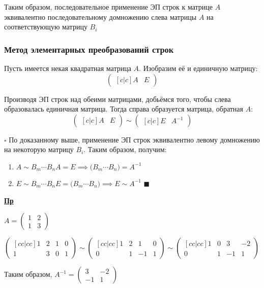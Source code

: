 \documentclass[12pt, a4paper]{report}
\newcommand{\ex}{\begin{flushleft}\textbf{\underline{Пр}}\end{flushleft}}
\begin{document}
	\bigskip Таким образом, последовательное применение ЭП строк к матрице \(A\) эквивалентно последовательному домножению слева матрицы \(A\) на соответствующую матрицу \(B_{i}\)
	
	\subsubsection{Метод элементарных преобразований строк}\leavevmode
	
	Пусть имеется некая квадратная матрица \(A\). Изобразим её и единичную матрицу: \[\begin{pmatrix}[c|c]A&E\end{pmatrix}\]
	
	Производя ЭП строк над обеими матрицами, добьёмся того, чтобы слева образовалась единичная матрица. Тогда справа образуется матрица, обратная \(A\): \[\begin{pmatrix}[c|c]A&E\end{pmatrix}\sim\begin{pmatrix}[c|c]E&A^{-1}\end{pmatrix}\]
	
	\newpage\(\square\) По доказанному выше, применение ЭП строк эквивалентно левому домножению на некоторую матрицу \(B_{i}\). Таким образом, получим:
	
	\begin{enumerate}[{4.}1)]
		\item \(A\sim B_{m}\dotsb B_{n}A=E\implies \big(B_{m}\dotsb B_{n}\big) = A^{-1}\)
		\item \(E\sim B_{m}\dotsb B_{n}E = \big(B_{m}\dotsb B_{n}\big)\implies E\sim A^{-1}\) \(\blacksquare\)
	\end{enumerate}
	\ex
	
	\(A=\begin{pmatrix}1&2\\1&3\end{pmatrix}\)
	
	\bigskip\(\begin{pmatrix}[cc|cc]1&2&1&0\\1&3&0&1\end{pmatrix}\sim\begin{pmatrix}[cc|cc]1&2&1&0\\0&1&-1&1\end{pmatrix}\sim\begin{pmatrix}[cc|cc]1&0&3&-2\\0&1&-1&1\end{pmatrix}\)
	
	\bigskip Таким образом, \(A^{-1}=\begin{pmatrix}3&-2\\-1&1\end{pmatrix}\)
	
\end{document}
